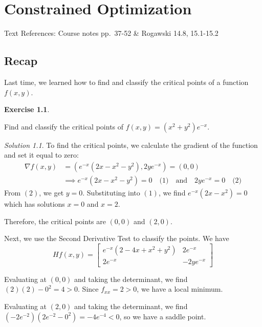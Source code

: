 \documentclass[
]{book}
\theoremstyle{definition}
\theoremstyle{definition}
\theoremstyle{definition}
\newtheorem{exercise}{Exercise}[chapter]
\theoremstyle{definition}
\theoremstyle{remark}
\newtheorem*{solution}{Solution}
\begin{document}
\hypertarget{lec-9}{%
\chapter{Constrained Optimization}\label{lec-9}}

Text References: Course notes pp.~37-52 \& Rogawski 14.8, 15.1-15.2

\hypertarget{recap-7}{%
\section{Recap}\label{recap-7}}

Last time, we learned how to find and classify the critical points of a function \(f(x,y)\).

\begin{exercise}
\protect\hypertarget{exr:unlabeled-div-65}{}\label{exr:unlabeled-div-65}

Find and classify the critical points of \(f(x,y)=(x^2+y^2)e^{-x}\).

\end{exercise}

\begin{solution}

To find the critical points, we calculate the gradient of the function and set it equal to zero:
\begin{align*}
\nabla f (x,y) &= (e^{-x}(2x-x^2-y^2), 2ye^{-x})=(0,0) \\
& \implies  e^{-x}(2x-x^2-y^2)=0 \quad\mbox{(1)}\quad \mbox{and} \quad 2ye^{-x}=0\quad\mbox{(2)}
\end{align*}
From \((2)\), we get \(y=0\). Substituting into \((1)\), we find \(e^{-x}(2x-x^2)=0\) which has solutions \(x=0\) and \(x=2\).

Therefore, the critical points are \((0,0)\) and \((2,0)\).

Next, we use the Second Derivative Test to classify the points. We have \[Hf(x,y)=\begin{bmatrix}e^{-x}(2-4x+x^2+y^2) & 2e^{-x}\\2e^{-x} & -2ye^{-x}\end{bmatrix}\]

Evaluating at \((0,0)\) and taking the determinant, we find \((2)(2)-0^2=4 >0\). Since \(f_{xx}=2>0\), we have a local minimum.

Evaluating at \((2,0)\) and taking the determinant, we find \((-2e^{-2})(2e^{-2}-0^2)=-4e^{-4}<0\), so we have a saddle point.

\end{solution}
\end{document}
